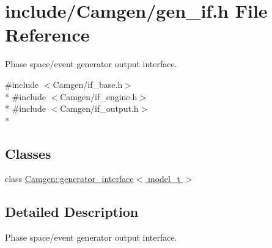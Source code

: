 \hypertarget{a00632}{\section{include/\-Camgen/gen\-\_\-if.h File Reference}
\label{a00632}
}


Phase space/event generator output interface.  


{\ttfamily \#include $<$Camgen/if\-\_\-base.\-h$>$}\\*
{\ttfamily \#include $<$Camgen/if\-\_\-engine.\-h$>$}\\*
{\ttfamily \#include $<$Camgen/if\-\_\-output.\-h$>$}\\*
\subsection*{Classes}
\begin{DoxyCompactItemize}
\item 
class \hyperlink{a00238}{Camgen\-::generator\-\_\-interface$<$ model\-\_\-t $>$}
\end{DoxyCompactItemize}


\subsection{Detailed Description}
Phase space/event generator output interface. 